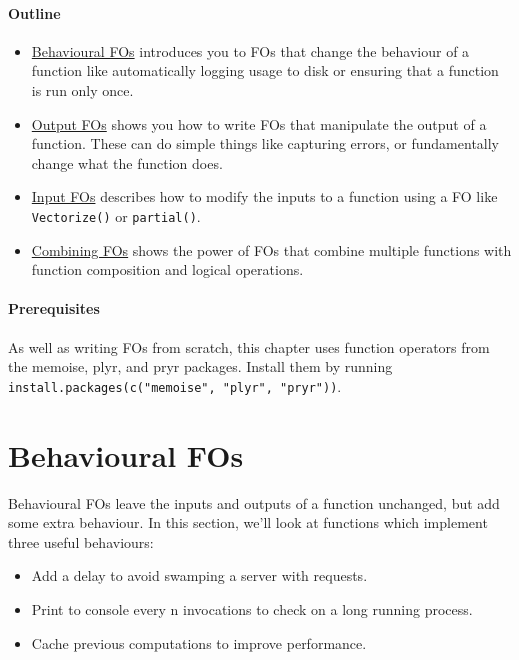 \hypertarget{outline}{%
\paragraph{Outline}\label{outline}}

\begin{itemize}
\item
  \protect\hyperlink{behavioural-fos}{Behavioural FOs} introduces you to
  FOs that change the behaviour of a function like automatically logging
  usage to disk or ensuring that a function is run only once.
\item
  \protect\hyperlink{output-fos}{Output FOs} shows you how to write FOs
  that manipulate the output of a function. These can do simple things
  like capturing errors, or fundamentally change what the function does.
\item
  \protect\hyperlink{input-fos}{Input FOs} describes how to modify the
  inputs to a function using a FO like \texttt{Vectorize()} or
  \texttt{partial()}.
\item
  \protect\hyperlink{combining-fos}{Combining FOs} shows the power of
  FOs that combine multiple functions with function composition and
  logical operations.
\end{itemize}

\hypertarget{prerequisites}{%
\paragraph{Prerequisites}\label{prerequisites}}

As well as writing FOs from scratch, this chapter uses function
operators from the memoise, plyr, and pryr packages. Install them by
running \texttt{install.packages(c("memoise",\ "plyr",\ "pryr"))}.

\hypertarget{behavioural-fos}{%
\section{Behavioural FOs}\label{behavioural-fos}}

Behavioural FOs leave the inputs and outputs of a function unchanged,
but add some extra behaviour. In this section, we'll look at functions
which implement three useful behaviours:

\begin{itemize}
\tightlist
\item
  Add a delay to avoid swamping a server with requests.
\item
  Print to console every n invocations to check on a long running
  process.
\item
  Cache previous computations to improve performance.
\end{itemize}

